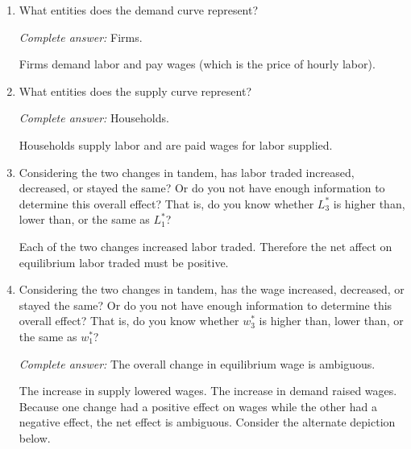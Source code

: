 \documentclass{assignment}
\begin{document}
\begin{enumerate}
\item What entities does the demand curve represent?

\begin{solution}
\emph{Complete answer:} Firms.

Firms demand labor and pay wages (which is the price of hourly labor).
\end{solution}

\item What entities does the supply curve represent?

\begin{solution}
\emph{Complete answer:} Households.

Households supply labor and are paid wages for labor supplied.
\end{solution}

\item Considering the two changes in tandem, has labor traded increased, decreased, or stayed the same? Or do you not have enough information to determine this overall effect? That is, do you know whether $L^*_3$ is higher than, lower than, or the same as $L^*_1$?

\begin{solution}
Each of the two changes increased labor traded. Therefore the net affect on equilibrium labor traded must be positive.
\end{solution}

\item Considering the two changes in tandem, has the wage increased, decreased, or stayed the same? Or do you not have enough information to determine this overall effect? That is, do you know whether $w^*_3$ is higher than, lower than, or the same as $w^*_1$?

\begin{solution}
\emph{Complete answer:} The overall change in equilibrium wage is ambiguous.

The increase in supply lowered wages. The increase in demand raised wages. Because one change had a positive effect on wages while the other had a negative effect, the net effect is ambiguous. Consider the alternate depiction below.

\begin{center}
\end{center}
\vspace{-12pt}
\end{solution}

\end{enumerate}
\end{document}

